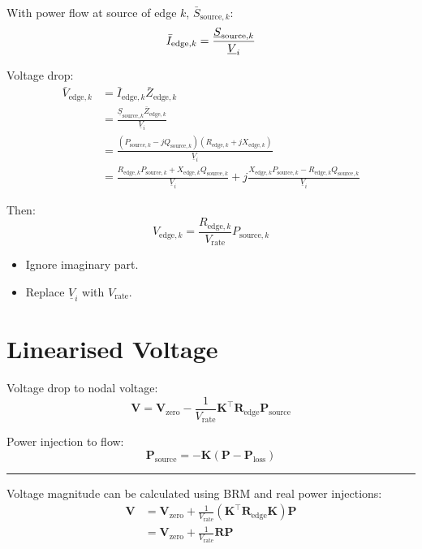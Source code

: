 \documentclass[
]{book}
\providecommand{\tightlist}{%
  \setlength{\itemsep}{0pt}\setlength{\parskip}{0pt}}
\begin{document}
With power flow at source of edge \(k\), \(\bar{S}_{\text{source}, k}\):
\[
\bar{I}_{\text{edge}, k}
  = \frac{\underline{S}_{\text{source}, k}}{\underline{V}_i} \\
\]

Voltage drop:
\[
\begin{aligned}
  \bar{V}_{\text{edge}, k}
  &= \bar{I}_{\text{edge}, k} \bar{Z}_{\text{edge}, k} \\
  &= \frac{
    \underline{S}_{\text{source}, k} \bar{Z}_{\text{edge}, k}
  }{\underline{V}_i} \\
  &= \frac{
    \left(P_{\text{source}, k} - j Q_{\text{source}, k} \right)
    \left(R_{\text{edge}, k} + j X_{\text{edge}, k} \right)
  }{\underline{V}_i} \\
  &= \frac{
    R_{\text{edge}, k} P_{\text{source}, k}
    + X_{\text{edge}, k} Q_{\text{source}, k}
  }{\underline{V}_i}
  + j \frac{
    X_{\text{edge}, k} P_{\text{source}, k}
    - R_{\text{edge}, k} Q_{\text{source}, k}
  }{\underline{V}_i}
\end{aligned}
\]

Then: \citep{conti2006voltage}
\[
V_{\text{edge}, k} =
  \frac{R_{\text{edge}, k}}{V_\text{rate}} P_{\text{source}, k}
\]

\begin{itemize}
\tightlist
\item
  Ignore imaginary part.
\item
  Replace \(\underline{V}_i\) with \(V_\text{rate}\).
\end{itemize}

\hypertarget{linearVoltage}{%
\section{Linearised Voltage}\label{linearVoltage}}

Voltage drop to nodal voltage:
\[
\boldsymbol{V}
  = \boldsymbol{V}_\text{zero}
  - \frac{1}{V_\text{rate}} \boldsymbol{K}^{\top}
  \boldsymbol{R}_\text{edge} \boldsymbol{P}_\text{source}
\]

Power injection to flow:
\[
\boldsymbol{P}_\text{source}
  = - \boldsymbol{K}
  \left(\boldsymbol{P} - \boldsymbol{P}_\text{loss} \right)
\]

\begin{center}\rule{0.5\linewidth}{0.5pt}\end{center}

Voltage magnitude can be calculated using BRM and real power injections:
\[ \begin{aligned}
  \boldsymbol{V} &= \boldsymbol{V}_\text{zero} + \frac{1}{V_\text{rate}}
    \left(
      \boldsymbol{K}^{\top} \boldsymbol{R}_\text{edge} \boldsymbol{K}
    \right) \boldsymbol{P} \\
  {} &= \boldsymbol{V}_\text{zero}
      + \frac{1}{V_\text{rate}} \boldsymbol{R} \boldsymbol{P}
\end{aligned} \]
\end{document}
